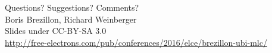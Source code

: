 \documentclass[aspectratio=169,obeyspaces,spaces,hyphens,dvipsnames]{beamer}
\begin{document}
\begin{frame}
  \begin{center}
  \Huge
  Questions? Suggestions? Comments?\\
  \vspace{1.5cm}
  \huge
  Boris Brezillon, Richard Weinberger\\
  \large
  \vspace{0.5cm}
  \vspace{0.5cm}
  \newline Slides under CC-BY-SA 3.0\\
  \scriptsize
  \url{http://free-electrons.com/pub/conferences/2016/elce/brezillon-ubi-mlc/}
  \end{center}
\end{frame}
\end{document}
